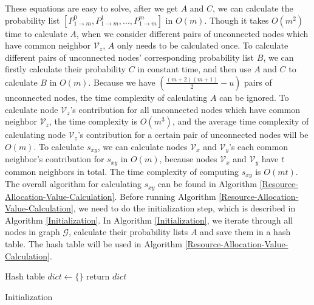 \documentclass[\main/thesis.tex]{subfiles}
\begin{document}
These equations are easy to solve, after we get $A$ and $C$, we can calculate the probability list $[P_{1\rightarrow m}^0, P_{1\rightarrow m}^1, ..., P_{1\rightarrow m}^{m}]$ in $O(m)$. Though it takes $O(m^2)$ time to calculate $A$, when we consider different pairs of unconnected nodes which have common neighbor $\mathcal{V}_z$, $A$ only needs to be calculated once. To calculate different pairs of unconnected nodes' corresponding probability list $B$, we can firstly calculate their probability $C$ in constant time, and then use $A$ and $C$ to calculate $B$ in $O(m)$. Because we have $(\frac{(m+2)(m+1)}{2}-u)$ pairs of unconnected nodes, the time complexity of calculating $A$ can be ignored. To calculate node $\mathcal{V}_z$'s contribution for all unconnected nodes which have common neighbor $\mathcal{V}_z$, the time complexity is $O(m^3)$, and the average time complexity of calculating node $\mathcal{V}_z$'s contribution for a certain pair of unconnected nodes will be $O(m)$. To calculate $s_{xy}$, we can calculate nodes $\mathcal{V}_x$ and $\mathcal{V}_y$'s each common neighbor's contribution for $s_{xy}$ in $O(m)$, because nodes $\mathcal{V}_x$ and $\mathcal{V}_y$ have $t$ common neighbors in total. The time complexity of computing $s_{xy}$ is $O(mt)$. The overall algorithm for calculating $s_{xy}$ can be found in Algorithm \ref{Resource-Allocation-Value-Calculation}. Before running Algorithm \ref{Resource-Allocation-Value-Calculation}, we need to do the initialization step, which is described in Algorithm \ref{Initialization}. In Algorithm \ref{Initialization}, we iterate through all nodes in graph $\mathcal{G}$, calculate their probability lists $A$ and save them in a hash table. The hash table will be used in Algorithm \ref{Resource-Allocation-Value-Calculation}.

\begin{algorithm}
Hash table $dict \leftarrow \{\}$\;
return $dict$\;
\caption{Initialization}
\label{Initialization}
\end{algorithm}
\end{document}
